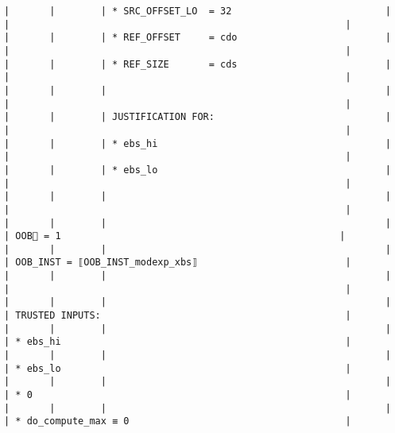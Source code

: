 \documentclass[varwidth=\maxdimen,margin=0.5cm,multi={verbatim}]{standalone}
\begin{document}
\begin{verbatim}
|       |        | * SRC_OFFSET_LO  = 32                           |                                          |                                                           |
|       |        | * REF_OFFSET     = cdo                          |                                          |                                                           |
|       |        | * REF_SIZE       = cds                          |                                          |                                                           |
|       |        |                                                 |                                          |                                                           |
|       |        | JUSTIFICATION FOR:                              |                                          |                                                           |
|       |        | * ebs_hi                                        |                                          |                                                           |
|       |        | * ebs_lo                                        |                                          |                                                           |
|       |        |                                                 |                                          |                                                           |
|       |        |                                                 |                                          | OOB🏴 = 1                                                 |
|       |        |                                                 |                                          | OOB_INST = ⟦OOB_INST_modexp_xbs⟧                          |
|       |        |                                                 |                                          |                                                           |
|       |        |                                                 |                                          | TRUSTED INPUTS:                                           |
|       |        |                                                 |                                          | * ebs_hi                                                  |
|       |        |                                                 |                                          | * ebs_lo                                                  |
|       |        |                                                 |                                          | * 0                                                       |
|       |        |                                                 |                                          | * do_compute_max ≡ 0                                      |

\end{verbatim}
\end{document}
